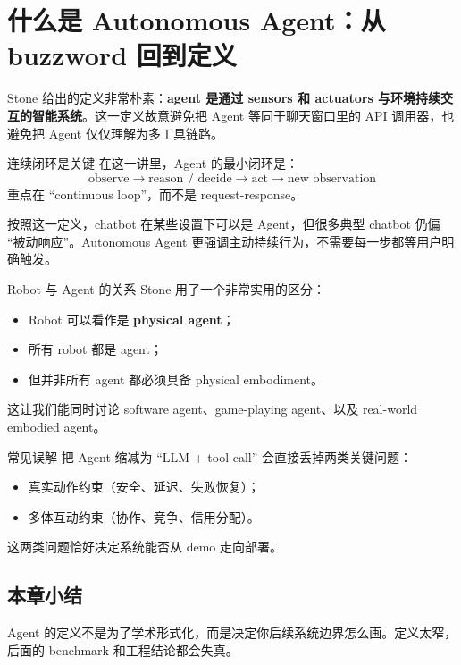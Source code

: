 \section{什么是 Autonomous Agent：从 buzzword 回到定义}

Stone 给出的定义非常朴素：\textbf{agent 是通过 sensors 和 actuators 与环境持续交互的智能系统}。这一定义故意避免把 Agent 等同于聊天窗口里的 API 调用器，也避免把 Agent 仅仅理解为多工具链路。

\begin{knowledgebox}{连续闭环是关键}
在这一讲里，Agent 的最小闭环是：
\[
\text{observe} \rightarrow \text{reason / decide} \rightarrow \text{act} \rightarrow \text{new observation}
\]
重点在 ``continuous loop''，而不是 request-response。
\end{knowledgebox}

按照这一定义，chatbot 在某些设置下可以是 Agent，但很多典型 chatbot 仍偏 ``被动响应''。Autonomous Agent 更强调主动持续行为，不需要每一步都等用户明确触发。

\begin{importantbox}{Robot 与 Agent 的关系}
Stone 用了一个非常实用的区分：
\begin{itemize}
    \item Robot 可以看作是 \textbf{physical agent}；
    \item 所有 robot 都是 agent；
    \item 但并非所有 agent 都必须具备 physical embodiment。
\end{itemize}
这让我们能同时讨论 software agent、game-playing agent、以及 real-world embodied agent。
\end{importantbox}

\begin{warningbox}{常见误解}
把 Agent 缩减为 ``LLM + tool call'' 会直接丢掉两类关键问题：
\begin{itemize}
    \item 真实动作约束（安全、延迟、失败恢复）；
    \item 多体互动约束（协作、竞争、信用分配）。
\end{itemize}
这两类问题恰好决定系统能否从 demo 走向部署。
\end{warningbox}

\subsection{本章小结}
Agent 的定义不是为了学术形式化，而是决定你后续系统边界怎么画。定义太窄，后面的 benchmark 和工程结论都会失真。

